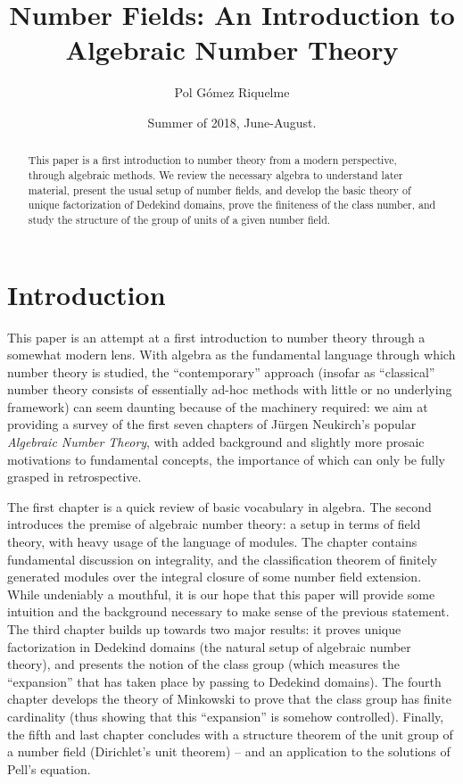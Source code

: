 \documentclass[psamsfonts]{amsart}
\title{Number Fields: An Introduction to Algebraic Number Theory}
\author{Pol Gómez Riquelme}
\date{Summer of 2018, June-August.}
\theoremstyle{definition}
\theoremstyle{remark}
\numberwithin{equation}{section}
\begin{document}
\begin{abstract}

This paper is a first introduction to number theory from a modern perspective, through algebraic methods. We review the necessary algebra to understand later material, present the usual setup of number fields, and develop the basic theory of unique factorization of Dedekind domains, prove the finiteness of the class number, and study the structure of the group of units of a given number field.

\end{abstract}

\maketitle

\tableofcontents

\section*{Introduction}

This paper is an attempt at a first introduction to number theory through a somewhat modern lens. With algebra as the fundamental language through which number theory is studied, the ``contemporary'' approach (insofar as ``classical'' number theory consists of essentially ad-hoc methods with little or no underlying framework) can seem daunting because of the machinery required: we aim at providing a survey of the first seven chapters of Jürgen Neukirch's popular \emph{Algebraic Number Theory}, with added background and slightly more prosaic motivations to fundamental concepts, the importance of which can only be fully grasped in retrospective.

The first chapter is a quick review of basic vocabulary in algebra. The second introduces the premise of algebraic number theory: a setup in terms of field theory, with heavy usage of the language of modules. The chapter contains fundamental discussion on integrality, and the classification theorem of finitely generated modules over the integral closure of some number field extension. While undeniably a mouthful, it is our hope that this paper will provide some intuition and the background necessary to make sense of the previous statement. The third chapter builds up towards two major results: it proves unique factorization in Dedekind domains (the natural setup of algebraic number theory), and presents the notion of the class group (which measures the ``expansion'' that has taken place by passing to Dedekind domains). The fourth chapter develops the theory of Minkowski to prove that the class group has finite cardinality (thus showing that this ``expansion'' is somehow controlled). Finally, the fifth and last chapter concludes with a structure theorem of the unit group of a number field (Dirichlet's unit theorem) -- and an application to the solutions of Pell's equation.
\end{document}
